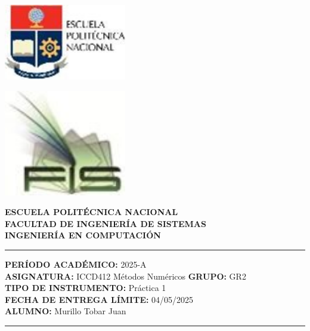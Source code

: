 \documentclass[12pt]{article}
\begin{document}
\begin{minipage}{0.45\textwidth}
    \includegraphics[width=0.4\textwidth]{inFiles/Figures/epnLogo.jpg}
\end{minipage}
\hfill
\begin{minipage}{0.45\textwidth}
    \raggedleft
    \includegraphics[width=0.4\textwidth]{inFiles/Figures/FIS_logo.jpg}
\end{minipage}

\vspace{0.5cm}

\begin{center}
    \textbf{ESCUELA POLITÉCNICA NACIONAL}\\[0.2cm]
    \textbf{FACULTAD DE INGENIERÍA DE SISTEMAS}\\[0.2cm]
    \textbf{INGENIERÍA {\textbf{EN COMPUTACIÓN}}}
\end{center}

\vspace{0.5cm}
\hrule
\vspace{0.5cm}

\noindent\textbf{PERÍODO ACADÉMICO:} 2025-A\\[0.2cm]
\noindent\textbf{ASIGNATURA:} ICCD412 Métodos Numéricos \hfill \textbf{GRUPO:} GR2\\[0.2cm]
\noindent\textbf{TIPO DE INSTRUMENTO:} Práctica 1\\[0.2cm]
\noindent\textbf{FECHA DE ENTREGA LÍMITE:} 04/05/2025\\[0.2cm]
\noindent\textbf{ALUMNO:} Murillo Tobar Juan

\vspace{0.5cm}
\hrule
\vspace{1cm}
\end{document}
